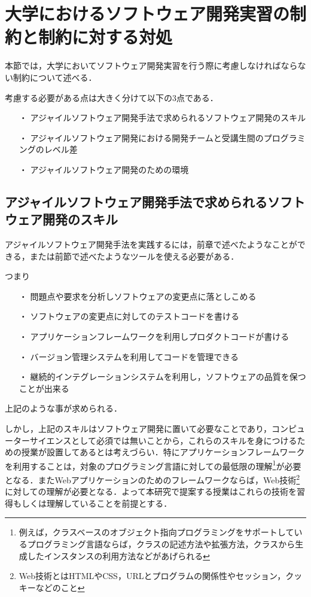 \section{大学におけるソフトウェア開発実習の制約と制約に対する対処}

本節では，大学においてソフトウェア開発実習を行う際に考慮しなければならない制約について述べる．

考慮する必要がある点は大きく分けて以下の3点である．

\begin{itemize}
\item[・] アジャイルソフトウェア開発手法で求められるソフトウェア開発のスキル
\item[・] アジャイルソフトウェア開発における開発チームと受講生間のプログラミングのレベル差
\item[・] アジャイルソフトウェア開発のための環境
\end{itemize}

\subsection{アジャイルソフトウェア開発手法で求められるソフトウェア開発のスキル}

アジャイルソフトウェア開発手法を実践するには，前章で述べたようなことができる，または前節で述べたようなツールを使える必要がある．

つまり

\begin{itemize}
\item[・]問題点や要求を分析しソフトウェアの変更点に落としこめる
\item[・]ソフトウェアの変更点に対してのテストコードを書ける
\item[・]アプリケーションフレームワークを利用しプロダクトコードが書ける
\item[・]バージョン管理システムを利用してコードを管理できる
\item[・]継続的インテグレーションシステムを利用し，ソフトウェアの品質を保つことが出来る
\end{itemize}

上記のような事が求められる．

しかし，上記のスキルはソフトウェア開発に置いて必要なことであり，コンピューターサイエンスとして必須では無いことから，これらのスキルを身につけるための授業が設置してあるとは考えづらい．特にアプリケーションフレームワークを利用することは，対象のプログラミング言語に対しての最低限の理解\footnote{例えば，クラスベースのオブジェクト指向プログラミングをサポートしているプログラミング言語ならば，クラスの記述方法や拡張方法，クラスから生成したインスタンスの利用方法などがあげられる}が必要となる．またWebアプリケーションのためのフレームワークならば，Web技術\footnote{Web技術とはHTMLやCSS，URLとプログラムの関係性やセッション，クッキーなどのこと}に対しての理解が必要となる．よって本研究で提案する授業はこれらの技術を習得もしくは理解していることを前提とする．


